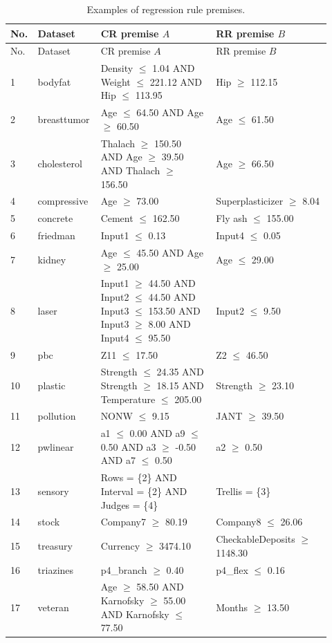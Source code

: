 \begingroup
\footnotesize
\setlength{\tabcolsep}{3pt}
\begin{longtable}{@{}p{0.04\linewidth}p{0.18\linewidth}p{0.35\linewidth}p{0.35\linewidth}@{}}
\caption{Examples of regression rule premises.}\\
\toprule
No. & Dataset & CR premise $A$ & RR premise $B$ \\
\midrule
\endfirsthead
\toprule
No. & Dataset & CR premise $A$ & RR premise $B$ \\
\midrule
\endhead
1 & bodyfat & Density $\leq$ 1.04 AND Weight $\leq$ 221.12 AND Hip $\leq$ 113.95 & Hip $\geq$ 112.15 \\
2 & breasttumor & Age $\leq$ 64.50 AND Age $\geq$ 60.50 & Age $\leq$ 61.50 \\
3 & cholesterol & Thalach $\geq$ 150.50 AND Age $\geq$ 39.50 AND Thalach $\geq$ 156.50 & Age $\geq$ 66.50 \\
4 & compressive & Age $\geq$ 73.00 & Superplasticizer $\geq$ 8.04 \\
5 & concrete & Cement $\leq$ 162.50 & Fly ash $\leq$ 155.00 \\
6 & friedman & Input1 $\leq$ 0.13 & Input4 $\leq$ 0.05 \\
7 & kidney & Age $\leq$ 45.50 AND Age $\geq$ 25.00 & Age $\leq$ 29.00 \\
8 & laser & Input1 $\geq$ 44.50 AND Input2 $\leq$ 44.50 AND Input3 $\leq$ 153.50 AND Input3 $\geq$ 8.00 AND Input4 $\leq$ 95.50 & Input2 $\leq$ 9.50 \\
9 & pbc & Z11 $\leq$ 17.50 & Z2 $\leq$ 46.50 \\
10 & plastic & Strength $\leq$ 24.35 AND Strength $\geq$ 18.15 AND Temperature $\leq$ 205.00 & Strength $\geq$ 23.10 \\
11 & pollution & NONW $\leq$ 9.15 & JANT $\geq$ 39.50 \\
12 & pwlinear & a1 $\leq$ 0.00 AND a9 $\leq$ 0.50 AND a3 $\geq$ -0.50 AND a7 $\leq$ 0.50 & a2 $\geq$ 0.50 \\
13 & sensory & Rows = \{2\} AND Interval = \{2\} AND Judges = \{4\} & Trellis = \{3\} \\
14 & stock & Company7 $\geq$ 80.19 & Company8 $\leq$ 26.06 \\
15 & treasury & Currency $\geq$ 3474.10 & CheckableDeposits $\geq$ 1148.30 \\
16 & triazines & p4\_branch $\geq$ 0.40 & p4\_flex $\leq$ 0.16 \\
17 & veteran & Age $\geq$ 58.50 AND Karnofsky $\geq$ 55.00 AND Karnofsky $\leq$ 77.50 & Months $\geq$ 13.50 \\
\bottomrule
\end{longtable}
\endgroup



